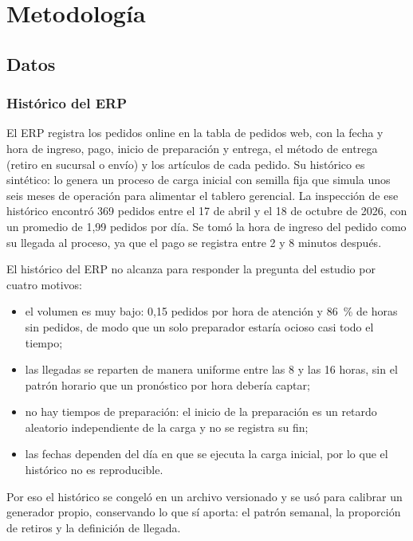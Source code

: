 \section{Metodología}
\subsection{Datos}
\label{sec:datos}

\subsubsection{Histórico del ERP}
El ERP registra los pedidos online en la tabla de pedidos web, con la fecha y hora de ingreso, pago, inicio de preparación y entrega, el método de entrega (retiro en sucursal o envío) y los artículos de cada pedido.
Su histórico es sintético: lo genera un proceso de carga inicial con semilla fija que simula unos seis meses de operación para alimentar el tablero gerencial.
La inspección de ese histórico encontró 369 pedidos entre el 17 de abril y el 18 de octubre de 2026, con un promedio de 1,99 pedidos por día.
Se tomó la hora de ingreso del pedido como su llegada al proceso, ya que el pago se registra entre 2 y 8 minutos después.

El histórico del ERP no alcanza para responder la pregunta del estudio por cuatro motivos:
\begin{itemize}
  \item el volumen es muy bajo: 0,15 pedidos por hora de atención y 86~\% de horas sin pedidos, de modo que un solo preparador estaría ocioso casi todo el tiempo;
  \item las llegadas se reparten de manera uniforme entre las 8 y las 16 horas, sin el patrón horario que un pronóstico por hora debería captar;
  \item no hay tiempos de preparación: el inicio de la preparación es un retardo aleatorio independiente de la carga y no se registra su fin;
  \item las fechas dependen del día en que se ejecuta la carga inicial, por lo que el histórico no es reproducible.
\end{itemize}
Por eso el histórico se congeló en un archivo versionado y se usó para calibrar un generador propio, conservando lo que sí aporta: el patrón semanal, la proporción de retiros y la definición de llegada.

